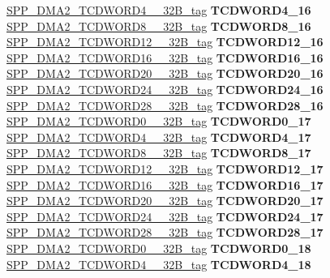 \begin{DoxyCompactItemize}
\begin{tabbing}
\>\>\mbox{\hyperlink{unionSPP__DMA2__TCDWORD4____32B__tag}{SPP\_DMA2\_TCDWORD4\_\_32B\_tag}} {\bfseries TCDWORD4\_16}\\
\>\>\mbox{\hyperlink{unionSPP__DMA2__TCDWORD8____32B__tag}{SPP\_DMA2\_TCDWORD8\_\_32B\_tag}} {\bfseries TCDWORD8\_16}\\
\>\>\mbox{\hyperlink{unionSPP__DMA2__TCDWORD12____32B__tag}{SPP\_DMA2\_TCDWORD12\_\_32B\_tag}} {\bfseries TCDWORD12\_16}\\
\>\>\mbox{\hyperlink{unionSPP__DMA2__TCDWORD16____32B__tag}{SPP\_DMA2\_TCDWORD16\_\_32B\_tag}} {\bfseries TCDWORD16\_16}\\
\>\>\mbox{\hyperlink{unionSPP__DMA2__TCDWORD20____32B__tag}{SPP\_DMA2\_TCDWORD20\_\_32B\_tag}} {\bfseries TCDWORD20\_16}\\
\>\>\mbox{\hyperlink{unionSPP__DMA2__TCDWORD24____32B__tag}{SPP\_DMA2\_TCDWORD24\_\_32B\_tag}} {\bfseries TCDWORD24\_16}\\
\>\>\mbox{\hyperlink{unionSPP__DMA2__TCDWORD28____32B__tag}{SPP\_DMA2\_TCDWORD28\_\_32B\_tag}} {\bfseries TCDWORD28\_16}\\
\>\>\mbox{\hyperlink{unionSPP__DMA2__TCDWORD0____32B__tag}{SPP\_DMA2\_TCDWORD0\_\_32B\_tag}} {\bfseries TCDWORD0\_17}\\
\>\>\mbox{\hyperlink{unionSPP__DMA2__TCDWORD4____32B__tag}{SPP\_DMA2\_TCDWORD4\_\_32B\_tag}} {\bfseries TCDWORD4\_17}\\
\>\>\mbox{\hyperlink{unionSPP__DMA2__TCDWORD8____32B__tag}{SPP\_DMA2\_TCDWORD8\_\_32B\_tag}} {\bfseries TCDWORD8\_17}\\
\>\>\mbox{\hyperlink{unionSPP__DMA2__TCDWORD12____32B__tag}{SPP\_DMA2\_TCDWORD12\_\_32B\_tag}} {\bfseries TCDWORD12\_17}\\
\>\>\mbox{\hyperlink{unionSPP__DMA2__TCDWORD16____32B__tag}{SPP\_DMA2\_TCDWORD16\_\_32B\_tag}} {\bfseries TCDWORD16\_17}\\
\>\>\mbox{\hyperlink{unionSPP__DMA2__TCDWORD20____32B__tag}{SPP\_DMA2\_TCDWORD20\_\_32B\_tag}} {\bfseries TCDWORD20\_17}\\
\>\>\mbox{\hyperlink{unionSPP__DMA2__TCDWORD24____32B__tag}{SPP\_DMA2\_TCDWORD24\_\_32B\_tag}} {\bfseries TCDWORD24\_17}\\
\>\>\mbox{\hyperlink{unionSPP__DMA2__TCDWORD28____32B__tag}{SPP\_DMA2\_TCDWORD28\_\_32B\_tag}} {\bfseries TCDWORD28\_17}\\
\>\>\mbox{\hyperlink{unionSPP__DMA2__TCDWORD0____32B__tag}{SPP\_DMA2\_TCDWORD0\_\_32B\_tag}} {\bfseries TCDWORD0\_18}\\
\>\>\mbox{\hyperlink{unionSPP__DMA2__TCDWORD4____32B__tag}{SPP\_DMA2\_TCDWORD4\_\_32B\_tag}} {\bfseries TCDWORD4\_18}\\

\end{tabbing}
\end{DoxyCompactItemize}
